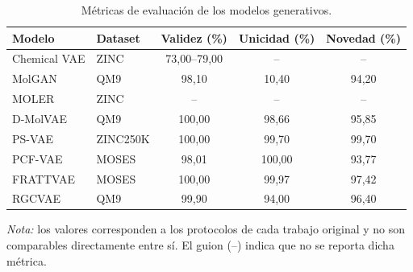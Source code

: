 \begin{table}[htbp]
    \centering
    \caption{Métricas de evaluación de los modelos generativos.}
    \label{tab:evaluacion}
    \begin{tabular}{l l c c c}
        \toprule
        \textbf{Modelo} & \textbf{Dataset} & \textbf{Validez (\%)} & \textbf{Unicidad (\%)} & \textbf{Novedad (\%)} \\
        \midrule
        Chemical VAE & ZINC & 73,00--79,00 & -- & -- \\
        MolGAN & QM9 & 98,10 & 10,40 & 94,20 \\
        MOLER & ZINC & -- & -- & -- \\
        D-MolVAE & QM9 & 100,00 & 98,66 & 95,85 \\
        PS-VAE & ZINC250K & 100,00 & 99,70 & 99,70 \\
        PCF-VAE & MOSES & 98,01 & 100,00 & 93,77 \\
        FRATTVAE & MOSES & 100,00 & 99,97 & 97,42 \\
        RGCVAE & QM9 & 99,90 & 94,00 & 96,40 \\
        \bottomrule
    \end{tabular}

    \vspace{0.3cm}
    \footnotesize \textit{Nota:} los valores corresponden a los protocolos de cada trabajo original y no son comparables directamente entre sí. El guion (--) indica que no se reporta dicha métrica.
\end{table}

